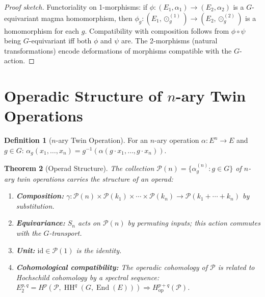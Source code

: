 \documentclass[11pt,twocolumn]{article}
\theoremstyle{plain}\newtheorem{theorem}{Theorem}\newtheorem{proposition}[theorem]{Proposition}\newtheorem{corollary}[theorem]{Corollary}\newtheorem{lemma}[theorem]{Lemma}
\theoremstyle{definition}\newtheorem{definition}[theorem]{Definition}\newtheorem{example}[theorem]{Example}
\theoremstyle{remark}\newtheorem{remark}[theorem]{Remark}
\newcommand{\HH}{\operatorname{HH}}
\newcommand{\End}{\operatorname{End}}
\begin{document}
\begin{proof}[Proof sketch]
Functoriality on 1-morphisms: if $\phi: (E_1, \alpha_1) \to (E_2, \alpha_2)$ is a $G$-equivariant magma homomorphism, then $\phi_g: (E_1, \odot_g^{(1)}) \to (E_2, \odot_g^{(2)})$ is a homomorphism for each $g$. Compatibility with composition follows from $\phi \circ \psi$ being $G$-equivariant iff both $\phi$ and $\psi$ are. The 2-morphisms (natural transformations) encode deformations of morphisms compatible with the $G$-action.
\end{proof}


\section{Operadic Structure of $n$-ary Twin Operations}
\label{sec:operads}

\begin{definition}[$n$-ary Twin Operation]\label{def:nary}
For an $n$-ary operation $\alpha: E^n \to E$ and $g \in G$:
$\alpha_g(x_1, \ldots, x_n) = g^{-1}(\alpha(g \cdot x_1, \ldots, g \cdot x_n))$.
\end{definition}

\begin{theorem}[Operad Structure]\label{thm:operad}
The collection $\mathcal{P}(n) = \{\alpha_g^{(n)} : g \in G\}$ of $n$-ary twin operations carries the structure of an operad:
\begin{enumerate}[label=(\alph*)]
    \item \textbf{Composition:} $\gamma: \mathcal{P}(n) \times \mathcal{P}(k_1) \times \cdots \times \mathcal{P}(k_n) \to \mathcal{P}(k_1 + \cdots + k_n)$ by substitution.
    \item \textbf{Equivariance:} $S_n$ acts on $\mathcal{P}(n)$ by permuting inputs; this action commutes with the $G$-transport.
    \item \textbf{Unit:} $\mathrm{id} \in \mathcal{P}(1)$ is the identity.
    \item \textbf{Cohomological compatibility:} The operadic cohomology of $\mathcal{P}$ is related to Hochschild cohomology by a spectral sequence:
    $E_2^{p,q} = H^p(\mathcal{P}, \HH^q(G, \End(E))) \Rightarrow H^{p+q}_{\mathrm{op}}(\mathcal{P})$.
\end{enumerate}
\end{theorem}
\end{document}
